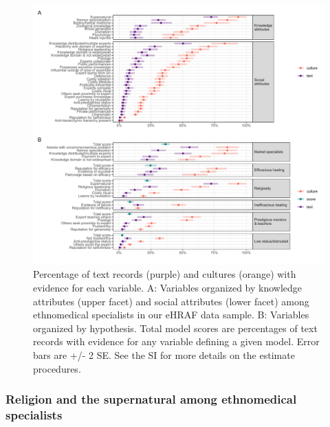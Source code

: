 \documentclass[
  11pt,
]{article}
\begin{document}
\begin{landscape}

\begin{figure}[p]

{\centering \includegraphics{magic-healers-article2_files/figure-latex/ehrafTotalEvidence-1} 

}

\caption{Percentage of text records (purple) and cultures (orange) with evidence for each variable. A: Variables organized by  knowledge attributes (upper facet) and social attributes (lower facet) among ethnomedical specialists in our eHRAF data sample. B: Variables organized by hypothesis. Total model scores are percentages of text records with evidence for any variable defining a given model. Error bars are +/- 2 SE. See the SI for more details on the estimate procedures.}\label{fig:ehrafTotalEvidence}
\end{figure}

\end{landscape}

\hypertarget{religion-and-the-supernatural-among-ethnomedical-specialists}{%
\subsubsection{Religion and the supernatural among ethnomedical specialists}\label{religion-and-the-supernatural-among-ethnomedical-specialists}}
\end{document}
